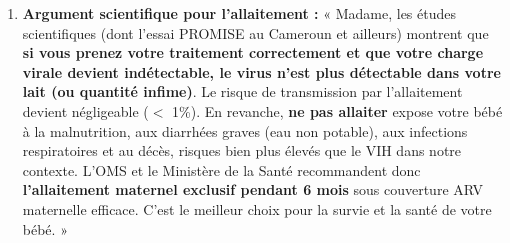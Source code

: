 \documentclass[11pt]{article}
\begin{document}
\begin{exoresolu}
\begin{enumerate}
    \begin{itemize}
        \item \textbf{Prophylaxie ARV dès la naissance (H+6h max) :} Selon protocole national (souvent Zidovudine AZT 2x/j + Névirapine NVP 1x/j pendant 6 semaines si mère sous ARV depuis $>$ 4 sem et CV contrôlée ; sinon protocole renforcé 12 sem). Ici mère découverte à 32 SA $\rightarrow$ traitement $>$ 4 sem avant accouchement probable $\rightarrow$ prophylaxie standard 6 semaines.
        \item \textbf{Allaitement maternel exclusif (AME) 6 mois :} Recommandé. Mère sous ARV efficace (CV indétectable) = risque transmission par lait $<$ 1\%. Avantages nutritionnels, immunitaires, économique, espacement naissances.
        \item \textbf{Sevrage rapide à 6 mois} (transition 1 mois) pour arrêter exposition au lait.
        \item \textbf{Dépistage virologique enfant (PCR ADN/ARN VIH) :} À la naissance (J0), à 6 semaines (fin prophylaxie), à 9 mois (fin allaitement), à 18 mois (test sérologique définitif).
    \end{itemize}
    \item \textbf{Argument scientifique pour l'allaitement :} « Madame, les études scientifiques (dont l'essai PROMISE au Cameroun et ailleurs) montrent que \textbf{si vous prenez votre traitement correctement et que votre charge virale devient indétectable, le virus n'est plus détectable dans votre lait (ou quantité infime)}. Le risque de transmission par l'allaitement devient négligeable ($<$ 1\%). En revanche, \textbf{ne pas allaiter} expose votre bébé à la malnutrition, aux diarrhées graves (eau non potable), aux infections respiratoires et au décès, risques bien plus élevés que le VIH dans notre contexte. L'OMS et le Ministère de la Santé recommandent donc \textbf{l'allaitement maternel exclusif pendant 6 mois} sous couverture ARV maternelle efficace. C'est le meilleur choix pour la survie et la santé de votre bébé. »
\end{enumerate}
\end{exoresolu}
\end{document}
